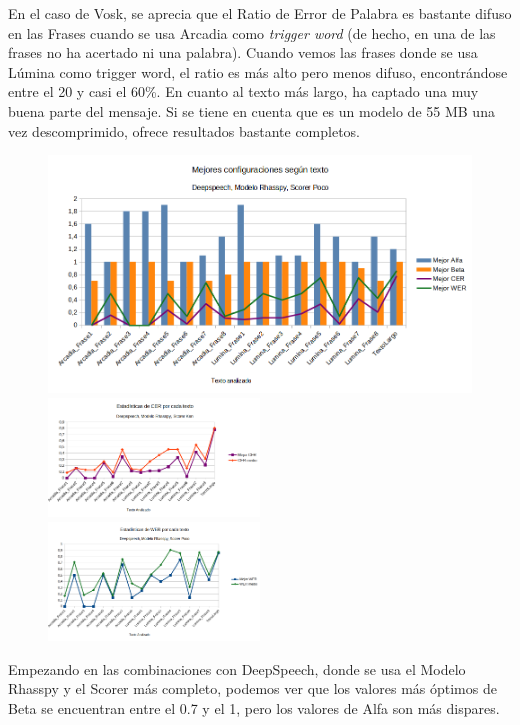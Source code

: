 En el caso de Vosk, se aprecia que el Ratio de Error de Palabra es bastante difuso en las Frases cuando se usa Arcadia como \textit{trigger word} (de hecho, en una de las frases no ha acertado ni una palabra). Cuando vemos las frases donde se usa Lúmina como trigger word, el ratio es más alto pero menos difuso, encontrándose entre el 20 y casi el 60\%. En cuanto al texto más largo, ha captado una muy buena parte del mensaje. 
Si se tiene en cuenta que es un modelo de 55 MB una vez descomprimido, ofrece resultados bastante completos.

\begin{figure}[H]
	\includegraphics[width=\textwidth]{imagenes/MejoresResultados_DeepSpeechIvanPocoRhasspy.png} \\
	\includegraphics[width=0.5\textwidth]{imagenes/CER_DeepSpeechIvanPocoRhasspy.png} \hfill \includegraphics[width=0.5\textwidth]{imagenes/WER_DeepspeechIvanPocoRhasspy.png}
\end{figure}

Empezando en las combinaciones con DeepSpeech, donde se usa el Modelo Rhasspy y el Scorer más completo, podemos ver que los valores más óptimos de Beta se encuentran entre el 0.7 y el 1, pero los valores de Alfa son más dispares. 

